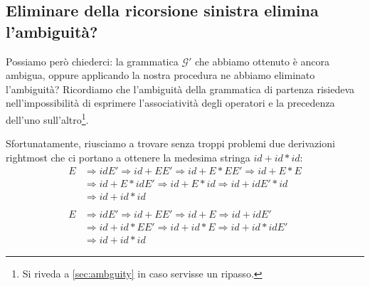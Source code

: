 \documentclass[class=book, crop=false, oneside, 12pt]{standalone}
\begin{document}
\subsection{Eliminare della ricorsione sinistra elimina l'ambiguità?}
Possiamo però chiederci: la grammatica \(\mathcal{G'}\) che abbiamo ottenuto è ancora ambigua, oppure applicando la nostra procedura ne abbiamo eliminato l'ambiguità? Ricordiamo che l'ambiguità della grammatica di partenza risiedeva nell'impossibilità di esprimere l'associatività degli operatori e la precedenza dell'uno sull'altro\footnote{Si riveda a \ref{sec:ambguity} in caso servisse un ripasso.}. 

Sfortunatamente, riusciamo a trovare senza troppi problemi due derivazioni rightmost che ci portano a ottenere la medesima stringa \(id + id * id\):
\begin{align*}
    E &\Rightarrow idE' \Rightarrow id + EE' \Rightarrow id + E * EE' \Rightarrow id + E * E \\
        &\Rightarrow id + E * idE' \Rightarrow id + E * id \Rightarrow id + idE' * id \\
        &\Rightarrow id + id * id 
    \\ \\
    E &\Rightarrow idE' \Rightarrow id + EE' \Rightarrow id + E \Rightarrow id + idE' \\
        &\Rightarrow id + id * EE' \Rightarrow id + id * E \Rightarrow id + id * idE' \\
        &\Rightarrow id + id * id  
\end{align*}
\end{document}
